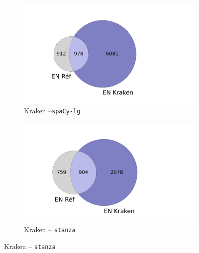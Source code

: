 \begin{figure}[h!]
    \begin{minipage}{7cm}
  \begin{subfigure}{1\textwidth}
  \includegraphics[width=1\textwidth]{IMAGES/INTERSECTIONS_GLOBALES/ELTeCFRA_Kraken_spacy-lg-concat_intersection.png} 
  \caption{Kraken --\texttt{spaCy-lg}}
  \label{fig:ELTeCFRA_Kraken_spacy-lg-concat_intersection}
  \end{subfigure}
  \end{minipage}
  \begin{minipage}{7cm}
  \begin{subfigure}{1\textwidth}
  \includegraphics[width=1\textwidth]{IMAGES/INTERSECTIONS_GLOBALES/ELTeCFRA_Kraken_stanza-concat_intersection.png}
  \caption{Kraken -- \texttt{stanza}}
  \end{subfigure}
    \end{minipage}

\end{figure}
